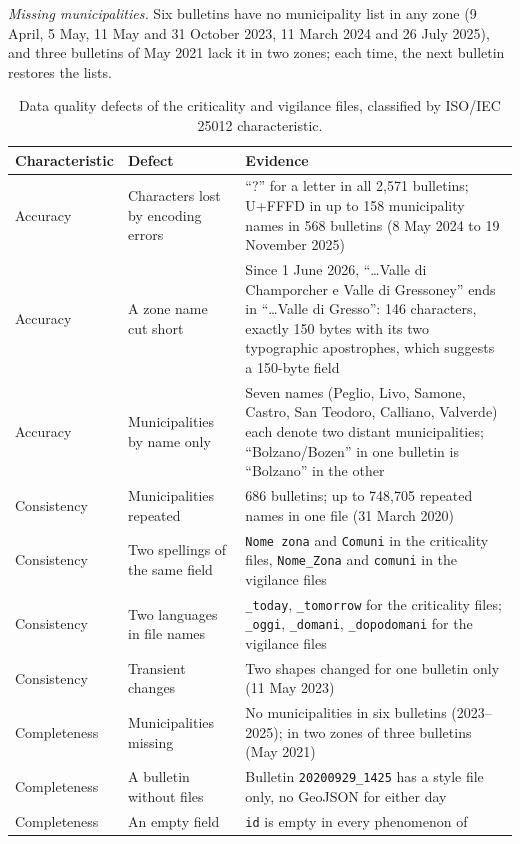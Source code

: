 \documentclass[review,authoryear,12pt]{elsarticle}
\newcommand{\field}[1]{\texttt{#1}}
\begin{document}
\emph{Missing municipalities.} Six bulletins have no municipality list in any
zone (9 April, 5 May, 11 May and 31 October 2023, 11 March 2024 and 26 July
2025), and three bulletins of May 2021 lack it in two zones; each time, the
next bulletin restores the lists.

\begin{table}[p]
\centering
\caption{Data quality defects of the criticality and vigilance files,
classified by ISO/IEC 25012 characteristic.}
\label{tab:defects}
\footnotesize
\begin{tabularx}{\linewidth}{@{}p{2.1cm}p{3.2cm}X@{}}
\toprule
Characteristic & Defect & Evidence \\
\midrule
Accuracy & Characters lost by encoding errors & ``?'' for a letter in all
2,571 bulletins; U+FFFD in up to 158 municipality names in 568 bulletins
(8 May 2024 to 19 November 2025) \\
Accuracy & A zone name cut short & Since 1 June 2026, ``\ldots Valle di
Champorcher e Valle di Gressoney'' ends in ``\ldots Valle di Gresso'': 146
characters, exactly 150 bytes with its two typographic apostrophes, which
suggests a 150-byte field \\
Accuracy & Municipalities by name only & Seven names (Peglio, Livo, Samone,
Castro, San Teodoro, Calliano, Valverde) each denote two distant
municipalities; ``Bolzano/Bozen'' in one bulletin is ``Bolzano'' in the
other \\
Consistency & Municipalities repeated & 686 bulletins; up to 748,705 repeated
names in one file (31 March 2020) \\
Consistency & Two spellings of the same field & \field{Nome zona} and
\field{Comuni} in the criticality files, \field{Nome\_Zona} and
\field{comuni} in the vigilance files \\
Consistency & Two languages in file names & \field{\_today},
\field{\_tomorrow} for the criticality files; \field{\_oggi},
\field{\_domani}, \field{\_dopodomani} for the vigilance files \\
Consistency & Transient changes & Two shapes changed for one bulletin only
(11 May 2023) \\
Completeness & Municipalities missing & No municipalities in six bulletins
(2023--2025); in two zones of three bulletins (May 2021) \\
Completeness & A bulletin without files & Bulletin \field{20200929\_1425} has
a style file only, no GeoJSON for either day \\
Completeness & An empty field & \field{id} is empty in every phenomenon of

\end{tabularx}
\end{table}
\end{document}
